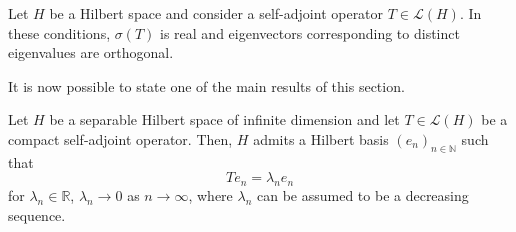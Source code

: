 \begin{proposition}
    Let \(H\) be a Hilbert space and consider a self-adjoint operator \(T\in \mathcal{L}(H)\). In these conditions, \(\sigma(T)\) is real and eigenvectors corresponding to distinct eigenvalues are orthogonal.
\end{proposition}
It is now possible to state one of the main results of this section.
\begin{theorem}\label{spectral_theorem}
    Let \(H\) be a separable Hilbert space of infinite dimension and let \(T \in \mathcal{L}(H)\) be a compact self-adjoint operator. Then, \(H\) admits a Hilbert basis \((e_n)_{n \in \mathbb{N}}\) such that
    \[
        T e_n = \lambda_n e_n
    \]
    for \(\lambda_n \in \mathbb{R}\), \(\lambda_n \rightarrow 0\) as \(n \rightarrow \infty\), where \(\lambda_n\) can be assumed to be a decreasing sequence.
\end{theorem}\label{fredholm_alt}

